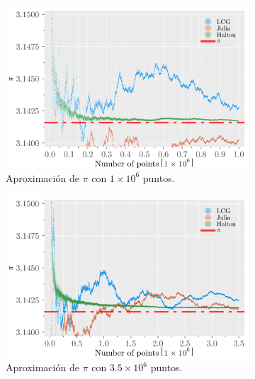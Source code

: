 \begin{enumerate}
\begin{solution}
        \clearpage
        \begin{figure}
            \centering
            \begin{subfigure}{0.45\textwidth}
                \centering
                \includegraphics[scale=0.065]{../figures/pies_1E6.png}
                \caption{Aproximación de $\pi$ con $1 \times 10^6$ puntos.}
                \label{fig:pi_approx_1e6}
            \end{subfigure}
            \hfill
            \begin{subfigure}{0.45\textwidth}
                \centering
                \includegraphics[scale=0.065]{../figures/pies_3dot5E6.png}
                \caption{Aproximación de $\pi$ con $3.5 \times 10^6$ puntos.}
                \label{fig:pi_approx_3.5e6}
            \end{subfigure}
            \begin{subfigure}{0.45\textwidth}

\end{subfigure}
\end{figure}
\end{solution}
\end{enumerate}
